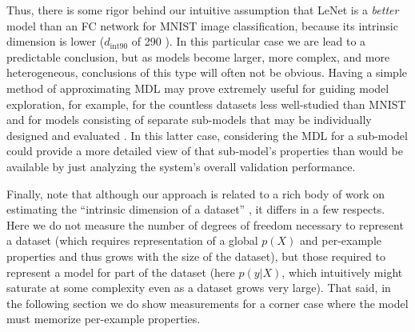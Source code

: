\documentclass{article} %
\newcommand{\dintn}{d_{\mathrm{int90}}}
\begin{document}
Thus, there is some rigor behind our intuitive assumption that LeNet is a \emph{better} model than an FC network for MNIST image classification, because its intrinsic dimension is lower ($\dintn$ of 290 ).
In this particular case we are lead to a predictable conclusion, but as models
become larger, more complex, and more heterogeneous, conclusions of this type will often not be
obvious. Having a simple method of approximating MDL may prove extremely useful for guiding model exploration, for example, for the countless datasets less well-studied than MNIST and for 
models consisting of separate sub-models that may be individually designed and evaluated \citep{ren-2015-faster-r-cnn:-towards,kaiser-2017-arXiv-one-model-to-learn-them}. In this latter case,
considering the MDL for a sub-model could provide a more detailed view of that sub-model's properties
than would be available by just analyzing the system's overall validation performance.

Finally, note that although our approach is related to a rich body of work on estimating the ``intrinsic dimension of a dataset'' \citep{camastra-2002-TPAMI-estimating-the-intrinsic-dimension,kegl-2003-NIPS-intrinsic-dimension-estimation,fukunaga-1971-ITC-an-algorithm-for-finding-intrinsic,levina-2005-NIPS-maximum-likelihood-estimation,tenenbaum-2000-Science-a-global-geometric-framework}, it differs in a few respects. Here we do not measure the number of degrees of freedom necessary to represent a dataset (which requires representation of a global $p(X)$ and per-example properties and thus grows with the size of the dataset), but those required to represent a model for part of the dataset (here $p(y|X)$, which intuitively might saturate at some complexity even as a dataset grows very large). That said, in the following section
we do show measurements for a corner case where the model must memorize per-example properties.

\end{document}

